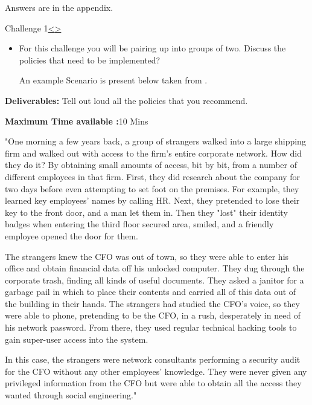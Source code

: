 \documentclass[12pt]{extarticle}
\newenvironment{instructionblock}{\Large\bgroup}{\egroup}
\begin{document}
Answers are in the appendix.

\pagebreak
\begin{slide}{Challenge 1}{\hyperref[slide 16]{\textless}\hyperref[slide 18]{\textgreater}}
	\vskip 5pt
	\begin{instructionblock}
		\begin{itemize}
		\item For this challenge you will be pairing up into groups of two. Discuss the policies that need to be implemented?
		
		An example Scenario is present below taken from\cite{b4} .
		
		\bigskip
		
		
		\end{itemize}
		
		\textbf{Deliverables:} Tell out loud all the policies that you recommend.
		
		\textbf{Maximum Time available :}10 Mins
	\end{instructionblock}
	
\end{slide}

"One morning a few years back, a group of strangers walked into a large shipping firm and walked out with access to the firm’s entire corporate network. How did they do it? By obtaining small amounts of access, bit by bit, from a number of different employees in that firm. First, they did research about the company for two days before even attempting to set foot on the premises. For example, they learned key employees’ names by calling HR. Next, they pretended to lose their key to the front door, and a man let them in. Then they "lost" their identity badges when entering the third floor secured area, smiled, and a friendly employee opened the door for them.

The strangers knew the CFO was out of town, so they were able to enter his office and obtain financial data off his unlocked computer. They dug through the corporate trash, finding all kinds of useful documents. They asked a janitor for a garbage pail in which to place their contents and carried all of this data out of the building in their hands. The strangers had studied the CFO's voice, so they were able to phone, pretending to be the CFO, in a rush, desperately in need of his network password. From there, they used regular technical hacking tools to gain super-user access into the system.

In this case, the strangers were network consultants performing a security audit for the CFO without any other employees' knowledge. They were never given any privileged information from the CFO but were able to obtain all the access they wanted through social engineering."
\end{document}
